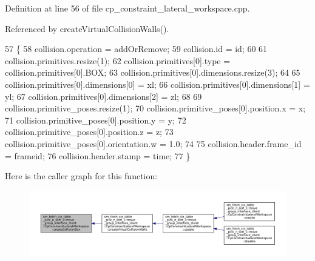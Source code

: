 Definition at line 56 of file cp\+\_\+constraint\+\_\+lateral\+\_\+workspace.\+cpp.



Referenced by create\+Virtual\+Collision\+Walls().


\begin{DoxyCode}
57         \{
58             collision.operation = addOrRemove;
59             collision.id = id;
60 
61             collision.primitives.resize(1);
62             collision.primitives[0].type = collision.primitives[0].BOX;
63             collision.primitives[0].dimensions.resize(3);
64 
65             collision.primitives[0].dimensions[0] = xl;
66             collision.primitives[0].dimensions[1] = yl;
67             collision.primitives[0].dimensions[2] = zl;
68 
69             collision.primitive\_poses.resize(1);
70             collision.primitive\_poses[0].position.x = x;
71             collision.primitive\_poses[0].position.y = y;
72             collision.primitive\_poses[0].position.z = z;
73             collision.primitive\_poses[0].orientation.w = 1.0;
74 
75             collision.header.frame\_id = frameid;
76             collision.header.stamp = time;
77         \}
\end{DoxyCode}
Here is the caller graph for this function\+:
\nopagebreak
\begin{figure}[H]
\begin{center}
\leavevmode
\includegraphics[width=350pt]{classsm__fetch__six__table__pick__n__sort__1_1_1move__group__interface__client_1_1CpConstraintLateralWorkspace_a79f5d783908c6f0a347d6917faa615a1_icgraph}
\end{center}
\end{figure}
\mbox{\label{classsm__fetch__six__table__pick__n__sort__1_1_1move__group__interface__client_1_1CpConstraintLateralWorkspace_a19423677db3f855f172e4fe614f826a2}} 
